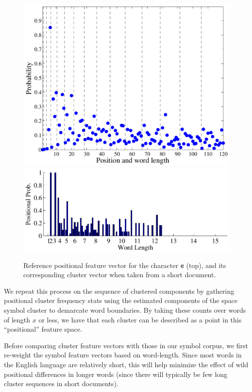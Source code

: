 \documentclass[times, 10pt,twocolumn]{article}
\begin{document}
\begin{figure}[ht]
  \centering
  \includegraphics[scale=.5]{figures/e_pos_feature}
  \includegraphics[scale=.5]{figures/e_pos_feature_clust}
  \caption{Reference positional feature vector for the character {\tt e} (top),
           and its corresponding cluster vector when taken from a short
           document. }
  \label{e_pos_fig}
\end{figure}

We repeat this process on the sequence of clustered components by
gathering positional cluster frequency stats using the estimated
components of the space symbol cluster to demarcate word boundaries.
By taking these counts over words of length $x$ or less, we have that
each cluster can be described as a point in this ``positional''
feature space.

Before comparing cluster feature vectors with those in our symbol
corpus, we first re-weight the symbol feature vectors based on
word-length.  Since most words in the English language are relatively
short, this will help minimize the effect of wild positional
differences in longer words (since there will typically be few long
cluster sequences in short documents).
\end{document}
